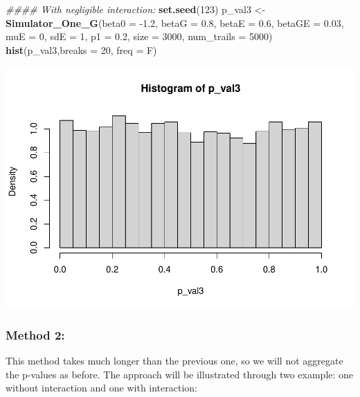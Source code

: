 \documentclass[
]{article}
\newenvironment{Shaded}{\begin{snugshade}}{\end{snugshade}}
\newcommand{\CommentTok}[1]{\textcolor[rgb]{0.56,0.35,0.01}{\textit{#1}}}
\newcommand{\DataTypeTok}[1]{\textcolor[rgb]{0.13,0.29,0.53}{#1}}
\newcommand{\DecValTok}[1]{\textcolor[rgb]{0.00,0.00,0.81}{#1}}
\newcommand{\FloatTok}[1]{\textcolor[rgb]{0.00,0.00,0.81}{#1}}
\newcommand{\KeywordTok}[1]{\textcolor[rgb]{0.13,0.29,0.53}{\textbf{#1}}}
\newcommand{\NormalTok}[1]{#1}
\newcommand{\StringTok}[1]{\textcolor[rgb]{0.31,0.60,0.02}{#1}}
\begin{document}
\begin{Shaded}
\begin{Highlighting}[]
\CommentTok{#### With negligible interaction:}
\KeywordTok{set.seed}\NormalTok{(}\DecValTok{123}\NormalTok{)}
\NormalTok{p_val3 <-}\StringTok{ }\KeywordTok{Simulator_One_G}\NormalTok{(}\DataTypeTok{beta0 =} \FloatTok{-1.2}\NormalTok{, }\DataTypeTok{betaG =} \FloatTok{0.8}\NormalTok{, }\DataTypeTok{betaE =} \FloatTok{0.6}\NormalTok{, }\DataTypeTok{betaGE =} \FloatTok{0.03}\NormalTok{, }\DataTypeTok{muE =} \DecValTok{0}\NormalTok{, }\DataTypeTok{sdE =} \DecValTok{1}\NormalTok{, }\DataTypeTok{p1 =} \FloatTok{0.2}\NormalTok{, }\DataTypeTok{size =} \DecValTok{3000}\NormalTok{, }\DataTypeTok{num_trails =} \DecValTok{5000}\NormalTok{)}
\KeywordTok{hist}\NormalTok{(p_val3,}\DataTypeTok{breaks =} \DecValTok{20}\NormalTok{, }\DataTypeTok{freq =}\NormalTok{ F)}
\end{Highlighting}
\end{Shaded}

\includegraphics{stats-gene-research-progress-v4_files/figure-latex/unnamed-chunk-1-4.pdf}

\hypertarget{method-2}{%
\subsubsection{Method 2:}\label{method-2}}

This method takes much longer than the previous one, so we will not
aggregate the p-values as before. The approach will be illustrated
through two example: one without interaction and one with interaction:
\end{document}
